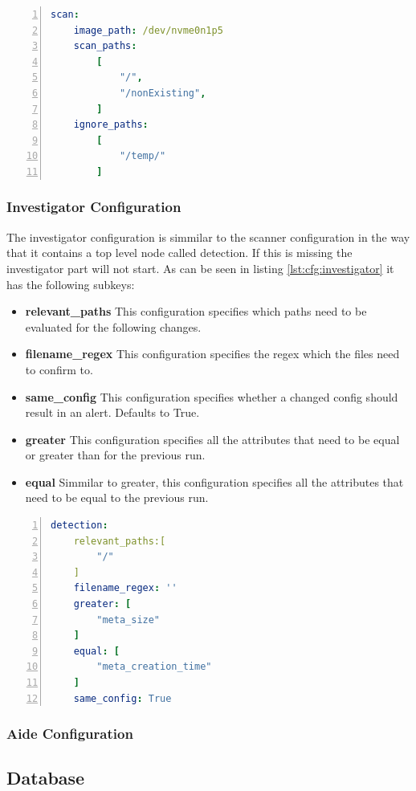 \documentclass[
	a4paper,					%
	10pt,							%
	twoside,					%
	openright,				%
	notitlepage,			%
	parskip=half,			%
]{scrreprt}					%
\begin{document}
\begin{lstlisting}[language=yaml, numbers=left, caption=Scanner Configuration, label=lst:cfg:scanner]
scan:
	image_path: /dev/nvme0n1p5
	scan_paths: 
		[
			"/",
			"/nonExisting",
		]
	ignore_paths: 
		[
			"/temp/"
		]
\end{lstlisting}

\subsubsection{Investigator Configuration}

The investigator configuration is simmilar to the scanner configuration in the way that it contains a top level node called detection. If this is missing the investigator part will not start. As can be seen in listing \ref{lst:cfg:investigator} it has the following subkeys:

\begin{itemize}
	\item \textbf{relevant\_paths} This configuration specifies which paths need to be evaluated for the following changes. 
	\item \textbf{filename\_regex} This configuration specifies the regex which the files need to confirm to.  
	\item \textbf{same\_config} This configuration specifies whether a changed config should result in an alert. Defaults to True.
	\item \textbf{greater} This configuration specifies all the attributes that need to be equal or greater than for the previous run.
	\item \textbf{equal} Simmilar to greater, this configuration specifies all the attributes that need to be equal to the previous run.
\end{itemize}

\begin{lstlisting}[language=yaml, numbers=left, caption=Investigator Configuration, label=lst:cfg:investigator]
detection:
	relevant_paths:[
		"/"
	]
	filename_regex: ''
	greater: [
		"meta_size"
	]
	equal: [
		"meta_creation_time"
	]
	same_config: True
\end{lstlisting}

\subsubsection{Aide Configuration}
\label{sec:aide:config}



\subsection{Database}
\label{sec:Database}
\end{document}
